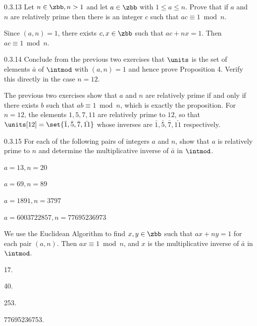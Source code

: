 \begin{exercise}{0.3.13}
    Let $n \in \zbb, n > 1$ and let $a \in \zbb$ with $1 \leq a \leq n$.
	Prove that if $a$ and $n$ are relatively prime then there is an integer $c$ such that $ac \equiv 1 \bmod n$.

\end{exercise}

\begin{sol}
    Since $(a, n) = 1$, there exists $c, x \in \zbb$ such that $ac + nx = 1$.
	Then $ac \equiv 1 \bmod n$.
\end{sol}

\begin{exercise}{0.3.14}
    Conclude from the previous two exercises that $\units$ is the set of elements $\bar a$ of $\intmod$ with $(a, n) = 1$ and hence prove Proposition 4.
	Verify this directly in the case $n = 12$.
\end{exercise}

\begin{sol}
    The previous two exercises show that $a$ and $n$ are relatively prime if and only if there exists $b$ such that $ab \equiv 1 \bmod n$, which is exactly the proposition.
	For $n = 12$, the elements $1, 5, 7, 11$ are relatively prime to $12$, so that $\units[12] = \set{\bar 1, \bar 5, \bar 7, \bar{11}} $ whose inverses are $\bar 1, \bar 5, \bar 7, \bar{11}$ respectively. 
\end{sol}

\begin{exercise}{0.3.15}
    For each of the following pairs of integers $a$ and $n$, show that $a$ is relatively prime to $n$ and determine the multiplicative inverse of $\bar a$ in $\intmod$.
    \begin{subexercises}
        \item $a = 13, n = 20$
        \item $a = 69, n = 89$
        \item $a = 1891, n = 3797$
        \item $a = 6003722857, n = 77695236973$
    \end{subexercises}
\end{exercise}

\begin{sol}
    We use the Euclidean Algorithm to find $x, y \in \zbb$ such that $ax + ny = 1$ for each pair $(a, n)$.
	Then $ax \equiv 1 \bmod n$, and $x$ is the multiplicative inverse of $\bar a$ in $\intmod$.
    \begin{subexercises}
        \item 17.
        \item 40.
        \item 253.
        \item 77695236753. \qedhere
    \end{subexercises}
\end{sol}

